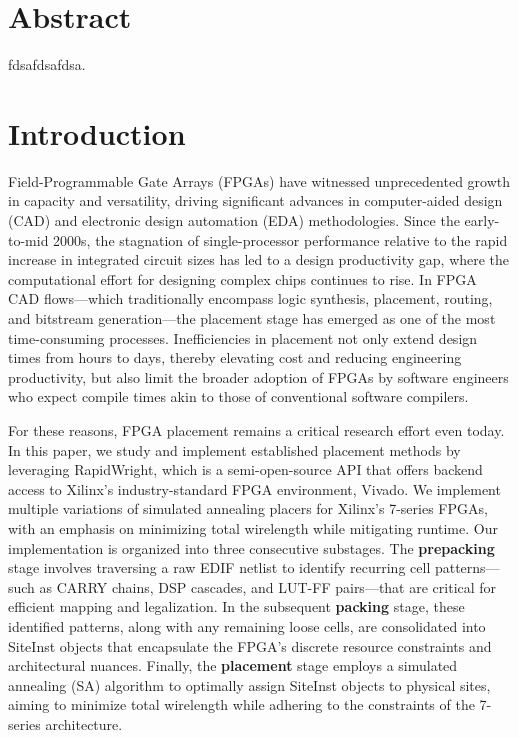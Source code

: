 \documentclass{article}
\begin{document}
\begin{multicols}{2}
\section{Abstract}
    fdsafdsafdsa.

\section{Introduction}

    Field-Programmable Gate Arrays (FPGAs) have witnessed unprecedented growth in capacity and versatility, driving significant advances in computer-aided design (CAD) and electronic design automation (EDA) methodologies. 
    Since the early-to-mid 2000s, the stagnation of single-processor performance relative to the rapid increase in integrated circuit sizes has led to a design productivity gap, where the computational effort for designing complex chips continues to rise. 
    In FPGA CAD flows—which traditionally encompass logic synthesis, placement, routing, and bitstream generation—the placement stage has emerged as one of the most time-consuming processes. 
    Inefficiencies in placement not only extend design times from hours to days, thereby elevating cost and reducing engineering productivity, but also limit the broader adoption of FPGAs by software engineers who expect compile times akin to those of conventional software compilers. 

    For these reasons, FPGA placement remains a critical research effort even today. 
    In this paper, we study and implement established placement methods by leveraging RapidWright, which is a semi-open-source API that offers backend access to Xilinx's industry-standard FPGA environment, Vivado. 
    We implement multiple variations of simulated annealing placers for Xilinx's 7-series FPGAs, with an emphasis on minimizing total wirelength while mitigating runtime. 
    Our implementation is organized into three consecutive substages. 
    The \textbf{prepacking} stage involves traversing a raw EDIF netlist to identify recurring cell patterns—such as CARRY chains, DSP cascades, and LUT-FF pairs—that are critical for efficient mapping and legalization. 
    In the subsequent \textbf{packing} stage, these identified patterns, along with any remaining loose cells, are consolidated into SiteInst objects that encapsulate the FPGA’s discrete resource constraints and architectural nuances. 
    Finally, the \textbf{placement} stage employs a simulated annealing (SA) algorithm to optimally assign SiteInst objects to physical sites, aiming to minimize total wirelength while adhering to the constraints of the 7-series architecture. 


\end{multicols}
\end{document}
